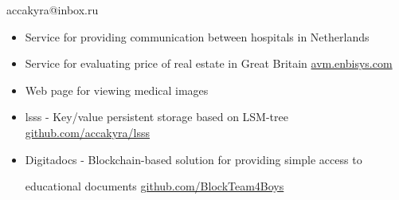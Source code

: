 \documentclass[]{cv-style}
\begin{document}

\begin{aside}
    \color{white} \LARGE{accakyra@inbox.ru}
\end{aside}

\vspace{7.9cm}



\vspace{0.7cm}


{\Large{}}

\begin{itemize}
    \item {\large {Service for providing communication between hospitals in Netherlands}}
    \item {\large {Service for evaluating price of real estate in Great Britain \href{avm.enbisys.com}{avm.enbisys.com}}}
    \item {\large Web page for viewing medical images}
\end{itemize}

{\small\makebox[0.2\linewidth][l]{\faCalendar\hspace{0.5em}{2018 November -- 2020 July}}}

\vspace{0.7cm}


\begin{itemize}
    \item {\large {lsss - Key/value persistent storage based on LSM-tree
    \href{https://github.com/accakyra/lsss}{github.com/accakyra/lsss}}}
    \item {\large {Digitadocs - Blockchain-based solution for providing simple access to

    educational documents \href{https://github.com/BlockTeam4Boys}{github.com/BlockTeam4Boys}}}
\end{itemize}

\vspace{0.5cm}


\vspace{0.7cm}



\vspace{0.7cm}
\end{document}
